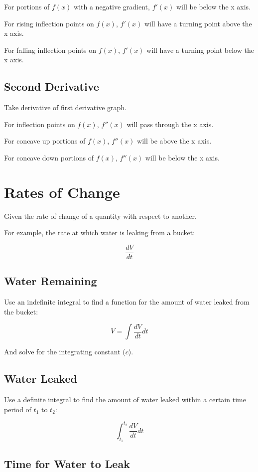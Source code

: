\documentclass[a4paper,11pt]{article}
\begin{document}
For portions of $f(x)$ with a negative gradient, $f'(x)$ will be below the x
axis.

For rising inflection points on $f(x)$, $f'(x)$ will have a turning point above
the x axis.

For falling inflection points on $f(x)$, $f'(x)$ will have a turning point
below the x axis.


\subsection{Second Derivative}

Take derivative of first derivative graph.

For inflection points on $f(x)$, $f''(x)$ will pass through the x axis.

For concave up portions of $f(x)$, $f''(x)$ will be above the x axis.

For concave down portions of $f(x)$, $f''(x)$ will be below the x axis.




\section{Rates of Change}

Given the rate of change of a quantity with respect to another.

For example, the rate at which water is leaking from a bucket:

$$
\frac{dV}{dt}
$$


\subsection{Water Remaining}

Use an indefinite integral to find a function for the amount of water leaked
from the bucket:

$$
V = \int \frac{dV}{dt} dt
$$

And solve for the integrating constant ($c$).


\subsection{Water Leaked}

Use a definite integral to find the amount of water leaked within a certain
time period of $t_1$ to $t_2$:

$$
\int_{t_1}^{t_2} \frac{dV}{dt} dt
$$


\subsection{Time for Water to Leak}
\end{document}

